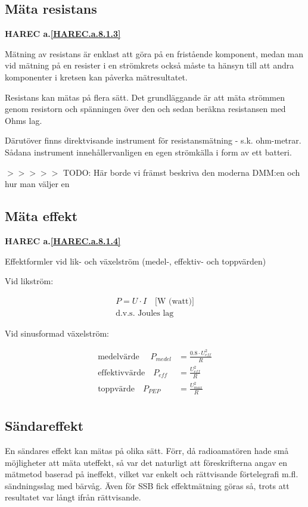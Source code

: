 \subsection{Mäta resistans}
\textbf{
HAREC a.\ref{HAREC.a.8.1.3}\label{myHAREC.a.8.1.3}
}

Mätning av resistans är enklast att göra på en fristående komponent,
medan man vid mätning på en resister i en strömkrets också måste ta
hänsyn till att andra komponenter i kretsen kan påverka mätresultatet.

Resistans kan mätas på flera sätt. Det grundläggande är att mäta
strömmen genom resistorn och spänningen över den och sedan beräkna
resistansen med Ohms lag.

Därutöver finns direktvisande instrument för resistansmätning -
s.k. ohm-metrar. Sådana instrument innehållervanligen en egen
strömkälla i form av ett batteri.

$>>>>>$ TODO: Här borde vi främst beskriva den moderna DMM:en och hur man väljer en

\subsection{Mäta effekt}
\textbf{
HAREC a.\ref{HAREC.a.8.1.4}\label{myHAREC.a.8.1.4}
}

Effektformler vid lik- och växelström (medel-, effektiv- och
toppvärden)

Vid likström:

\begin{gather*}
P = U \cdot I \quad \text{[W (watt)]} \\
\text{d.v.s. Joules lag}
\end{gather*}

Vid sinusformad växelström:

\begin{align*}
  \text{medelvärde   } \quad P_{medel} &= \frac{0.8\cdot U_{eff}^2}{R} \\
  \text{effektivvärde} \quad   P_{eff} &= \frac{U_{eff}^2}{R} \\
  \text{toppvärde}     \quad   P_{PEP} &= \frac{U_{max}^2}{R} \\
\end{align*}

\subsection{Sändareffekt}

En sändares effekt kan mätas på olika sätt.  Förr, då radioamatören
hade små möjligheter att mäta uteffekt, så var det naturligt att
föreskrifterna angav en mätmetod baserad på ineffekt, vilket var
enkelt och rättvisande förtelegrafi m.fl. sändningsslag med bärvåg.
Även för SSB fick effektmätning göras så, trots att resultatet var
långt ifrån rättvisande.

